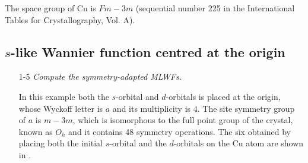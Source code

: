 \clearpage
The space group of Cu is $Fm{-}3m$ (sequential  number 225 in the International Tables for Crystallography, Vol. A).


\subsection*{$s$-like Wannier function centred at the origin}
\begin{itemize}
	\item [1-5] {\it Compute the symmetry-adapted MLWFs.}

	In this example both the $s$-orbital and $d$-orbitals is placed at the origin, whose Wyckoff letter is $a$ and its multiplicity is $4$. The site symmetry group of $a$ is $m{-}3m$, which is isomorphous to the full point group of the crystal, known as $O_h$ and it contains 48 symmetry operations.
    The six \MLWFs{} obtained by placing both the initial $s$-orbital and the $d$-orbitals on the Cu atom are shown in .
\end{itemize}

